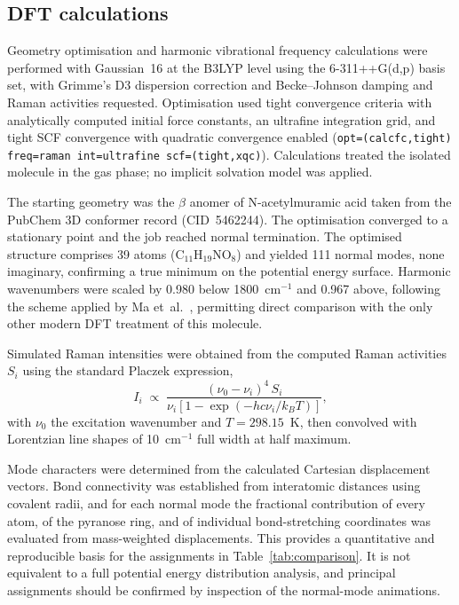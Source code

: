 \documentclass[11pt,a4paper]{article}
\newcommand{\wn}{\ensuremath{\mathrm{cm}^{-1}}}
\begin{document}
\subsection{DFT calculations}

Geometry optimisation and harmonic vibrational frequency calculations were
performed with Gaussian~16 \cite{gaussian16} at the B3LYP level
\cite{becke1993,lee1988} using the 6-311++G(d,p) basis set, with Grimme's D3
dispersion correction and Becke--Johnson damping \cite{grimme2011} and Raman
activities requested. Optimisation used tight convergence criteria with
analytically computed initial force constants, an ultrafine integration grid,
and tight SCF convergence with quadratic convergence enabled
(\texttt{opt=(calcfc,tight) freq=raman int=ultrafine scf=(tight,xqc)}).
Calculations treated the isolated molecule in the gas phase; no implicit
solvation model was applied.

The starting geometry was the $\beta$ anomer of N-acetylmuramic acid taken from
the PubChem 3D conformer record (CID~5462244). The optimisation converged to a
stationary point and the job reached normal termination. The optimised structure
comprises 39 atoms (C$_{11}$H$_{19}$NO$_8$) and yielded 111 normal modes, none
imaginary, confirming a true minimum on the potential energy surface. Harmonic
wavenumbers were scaled by 0.980 below 1800~\wn{} and 0.967 above, following the
scheme applied by Ma et~al.\ \cite{ma2024ecoli}, permitting direct comparison
with the only other modern DFT treatment of this molecule.

Simulated Raman intensities were obtained from the computed Raman activities
$S_i$ using the standard Placzek expression,
\begin{equation}
I_i \;\propto\; \frac{(\nu_0-\nu_i)^4\,S_i}
{\nu_i\left[1-\exp\!\left(-hc\nu_i/k_BT\right)\right]},
\end{equation}
with $\nu_0$ the excitation wavenumber and $T = 298.15$~K, then convolved with
Lorentzian line shapes of 10~\wn{} full width at half maximum.

Mode characters were determined from the calculated Cartesian displacement
vectors. Bond connectivity was established from interatomic distances using
covalent radii, and for each normal mode the fractional contribution of every
atom, of the pyranose ring, and of individual bond-stretching coordinates was
evaluated from mass-weighted displacements. This provides a quantitative and
reproducible basis for the assignments in Table~\ref{tab:comparison}. It is not
equivalent to a full potential energy distribution analysis, and principal
assignments should be confirmed by inspection of the normal-mode animations.
\end{document}
